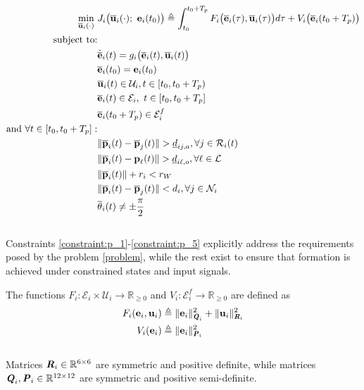 \begin{align}
  \min\limits_{\overline{\bm{\mathbf{u}}}_i (\cdot)}\ &
    J_i \big(\overline{\bm{\mathbf{u}}}_i (\cdot);\ \bm{\mathbf{e}}_i(t_0)\big) \triangleq
      \int_{t_0}^{t_0 + T_p} F_i \big(\overline{\bm{\mathbf{e}}}_i(\tau), \overline{\bm{\mathbf{u}}}_i (\tau)\big) d \tau +
      V_i \big(\overline{\bm{\mathbf{e}}}_i (t_0 + T_p)\big) \label{position_based_cost} \\
  \text{subject to:} & \nonumber \\
  & \dot{\overline{\bm{\mathbf{e}}}}_i(t) = g_i \big(\overline{\bm{\mathbf{e}}}_i (t), \overline{\bm{\mathbf{u}}}_i (t)\big) \\
  & \overline{\bm{\mathbf{e}}}_i (t_0) = \bm{\mathbf{e}}_i (t_0) \\
  & \overline{\bm{\mathbf{u}}}_i(t) \in \mathcal{U}_i, t \in [t_0, t_0 + T_p)\\
  & \overline{\bm{\mathbf{e}}}_i (t) \in \mathcal{E}_i,\ t \in [t_0, t_0 + T_p]\\
  & \overline{\bm{\mathbf{e}}}_i (t_0 + T_p) \in \mathcal{E}_i^f \\
  \text{and } \forall t \in [t_0, t_0 + T_p]:& \nonumber \\
  & \|\overline{\bm{\mathbf{p}}}_i(t) - \overline{\bm{\mathbf{p}}}_j(t)\| > \underline{d}_{ij,a}, \forall j \in \mathcal{R}_i(t) \label{constraint:p_1}\\
  & \|\overline{\bm{\mathbf{p}}}_i(t) - \bm{\mathbf{p}}_{\ell}(t)\| > \underline{d}_{i\ell,o}, \forall \ell \in \mathcal{L} \\
  & \|\overline{\bm{\mathbf{p}}}_i(t)\| + r_i < r_W \\
  & \|\overline{\bm{\mathbf{p}}}_i(t) - \overline{\bm{\mathbf{p}}}_j(t)\| < d_i, \forall j \in \mathcal{N}_i \\
  & \overline{\theta}_i(t) \ne \pm \frac{\pi}{2} \label{constraint:p_5}
\end{align}\\
Constraints \ref{constraint:p_1}-\ref{constraint:p_5} explicitly address the
requirements posed by the problem \eqref{problem}, while the rest exist to
ensure that formation is achieved under constrained states and input signals.

The functions
$F_i : \mathcal{E}_i \times \mathcal{U}_i \to \mathbb{R}_{\geq 0}$ and
$V_i: \mathcal{E}_i^f \to \mathbb{R}_{\geq 0}$ are defined as
\begin{align}
  F_i (\bm{\mathbf{e}}_i, \bm{\mathbf{u}}_i)
    &\triangleq \| \bm{\mathbf{e}}_i\|_{\bm{\mathit{Q}}_i}^2 + \| \bm{\mathbf{u}}_i\|_{\bm{\mathit{R}}_i}^2 \\
  V_i (\bm{\mathbf{e}}_i)
    & \triangleq \| \bm{\mathbf{e}}_i \|_{\bm{\mathit{P}}_i}^2
\end{align}\\
Matrices $\bm{\mathit{R}}_i \in \mathbb{R}^{6 \times 6}$ are symmetric and positive
definite, while matrices $\bm{\mathit{Q}}_i, \bm{\mathit{P}}_i \in \mathbb{R}^{12 \times 12}$
are symmetric and positive semi-definite.

